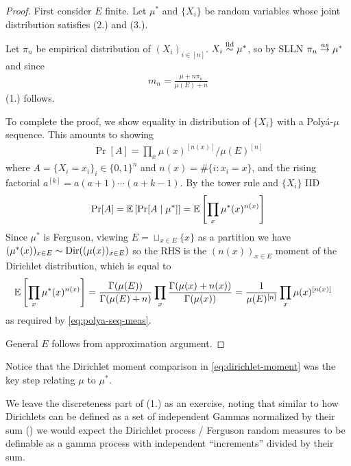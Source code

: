 \begin{proof}
  First consider $E$ finite.
  Let $\mu^*$ and $\{X_i\}$
  be random variables whose joint distribution satisfies (2.)
  and (3.).

  Let $\pi_n$ be empirical distribution of $(X_i)_{i \in [n]}$.
  $X_i \overset{\text{iid}}{\sim} \mu^*$, so by SLLN $\pi_n \overset{as}{\to} \mu^*$ and since
  \begin{align}
    m_n = \frac{\mu + n \pi_n}{\mu(E) + n}
  \end{align}
  (1.) follows.

  To complete the proof, we show equality in distribution of $\{X_i\}$
  with a Poly\'a-$\mu$ sequence.
  This amounts to showing
  \begin{align}
    \label{eq:polya-seq-meas}
    \Pr[A] = \prod_x \mu(x)^{[n(x)]} / \mu(E)^{[n]}
  \end{align}
  where $A = \{X_i = x_i\}_{i} \in \{0,1\}^n$ and
  $n(x) = \#\{i : x_i = x\}$,
  and the rising factorial $a^{[k]} = a (a+1) \cdots (a+k-1)$.
  By the tower rule and $\{X_i\}$ IID
  \begin{align}
    \Pr[A]
    = \mathbb{E}\left[
      \Pr[A \mid \mu^*]
    \right]
    = \mathbb{E}\left[
      \prod_x \mu^*(x)^{n(x)}
    \right]
  \end{align}
  Since $\mu^*$ is Ferguson, viewing $E = \sqcup_{x \in E} \{x\}$
  as a partition we have
  $(\mu^*(x))_{x \in E} \sim \mathrm{Dir}((\mu(x))_{x \in E})$
  so the RHS is the $(n(x))_{x \in E}$ moment of the Dirichlet distribution,
  which is equal to
  \begin{align}
    \label{eq:dirichlet-moment}
    \mathbb{E}\left[
      \prod_x \mu^*(x)^{n(x)}
    \right]
    &= \frac{\Gamma(\mu(E))}{\Gamma(\mu(E) + n)}
    \prod_{x} \frac{\Gamma(\mu(x) + n(x))}{\Gamma(\mu(x))}
    = \frac{1}{\mu(E)^{[n]}} \prod_x \mu(x)^{[n(x)]}
  \end{align}
  as required by \cref{eq:polya-seq-meas}.



  General $E$ follows from approximation argument.
\end{proof}

Notice that the Dirichlet moment comparison in \cref{eq:dirichlet-moment} was
the key step relating $\mu$ to $\mu^*$.

We leave the discreteness part of (1.) as an exercise, noting that
similar to how Dirichlets can be defined as a set of independent
Gammas normalized by their sum ()
we would expect the Dirichlet process / Ferguson random measures
to be definable as a gamma process with independent ``increments''
divided by their sum.

